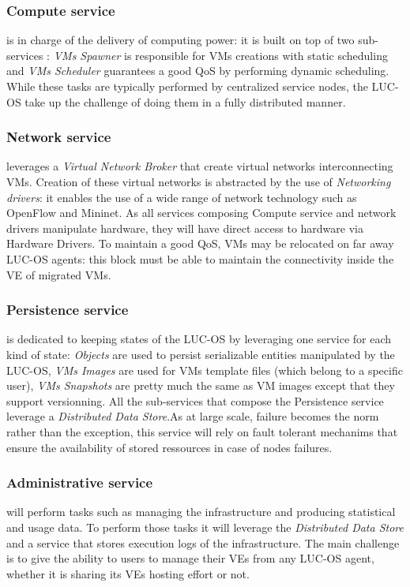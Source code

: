 \subsubsection{Compute service}
is in charge of the delivery of computing power: it is built on top of two 
sub-services : \emph{VMs Spawner} is responsible for VMs creations with static 
scheduling and \emph{VMs Scheduler} guarantees a good QoS by performing dynamic 
scheduling. While these tasks are typically performed by centralized service 
nodes, the LUC-OS take up the challenge of doing them in a fully distributed
manner.

\subsubsection{Network service} 
leverages a \emph{Virtual Network Broker} that create virtual networks 
interconnecting VMs. Creation of these virtual networks is abstracted by the use
of \emph{Networking drivers}: it enables the use of a wide range of network 
technology such as OpenFlow and Mininet. As all services composing Compute 
service and network drivers manipulate hardware, they will have direct access to
hardware via Hardware Drivers. To maintain a good QoS, VMs may be relocated on 
far away LUC-OS agents: this block must be able to maintain the connectivity 
inside the VE of migrated VMs.

\subsubsection{Persistence service}
is dedicated to keeping states of the LUC-OS by leveraging one service for each
kind of state: \emph{Objects} are used to persist serializable entities 
manipulated by the LUC-OS, \emph{VMs Images} are used for VMs template files 
(which belong to a specific user), \emph{VMs Snapshots} are pretty much the same
as VM images except that they support versionning. All the sub-services that 
compose the Persistence service leverage a \emph{Distributed Data Store}.As at 
large scale, failure becomes the norm rather than the exception, this service 
will rely on fault tolerant mechanims that ensure the availability of stored 
ressources in case of nodes failures.

\subsubsection{Administrative service} 
will perform tasks such as managing the infrastructure and producing statistical
and usage data. To perform those tasks it will leverage the \emph{Distributed 
Data Store} and a service that stores execution logs of the infrastructure. The 
main challenge is to give the ability to users to manage their VEs from any 
LUC-OS agent, whether it is sharing its VEs hosting effort or not. 



